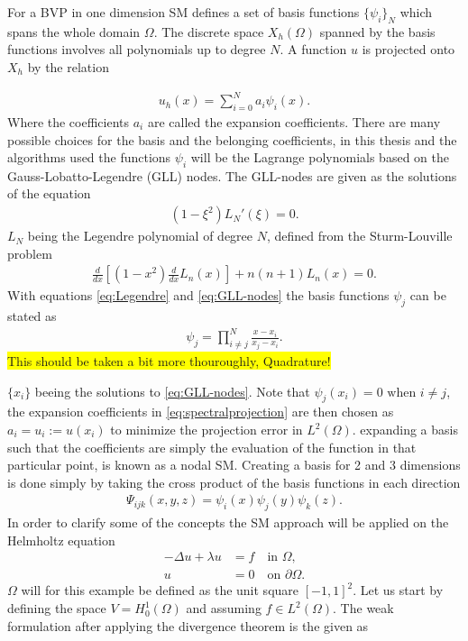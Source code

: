For a BVP in one dimension SM defines a set of basis functions $\{\psi_i\}_N$ which spans the whole domain $\Omega$. 
The discrete space $X_h(\Omega)$ spanned by the basis functions involves all polynomials up to degree $N$.
A function $u$ is projected onto $X_h$ by the relation

\begin{align}
    u_h(x) = \sum_{i=0}^N a_i\psi_i(x).
    \label{eq:spectralprojection}
\end{align}
Where the coefficients $a_i$ are called the expansion coefficients. There are many possible choices for the basis and the belonging coefficients, 
in this thesis and the algorithms used the functions $\psi_i$ will be the Lagrange polynomials based on the Gauss-Lobatto-Legendre (GLL) nodes. 
The GLL-nodes are given as the solutions of the equation 
\begin{align}
    (1-\xi^2)L_N'(\xi) = 0.
    \label{eq:GLL-nodes}
\end{align}
$L_N$ being the Legendre polynomial of degree $N$, defined from the Sturm-Louville problem
\begin{align}
    \frac{d}{dx}\left[  (1-x^2)\frac{d}{dx}L_n(x)\right]+n(n+1)L_n(x) = 0.
    \label{eq:Legendre}
\end{align}
With equations \ref{eq:Legendre} and \ref{eq:GLL-nodes} the basis functions $\psi_j$ can be stated as 
\begin{align}
    \psi_j = \prod_{i\neq j}^{N}\frac{x-x_i}{x_j-x_i}.
    \label{eq:Lagrange}
\end{align}
\colorbox{yellow}{This should be taken a bit more thouroughly, Quadrature! }

$\{x_i\}$ beeing the solutions to \ref{eq:GLL-nodes}. Note that $\psi_j(x_i) = 0 \text{ when } i \neq j$,
the expansion coefficients in \ref{eq:spectralprojection} are then chosen as $a_i = u_i :=u(x_i)$ to minimize the projection error in $L^2(\Omega)$. 
expanding a basis such that the coefficients are simply the evaluation of the function in that particular point, is known as a nodal SM. 
Creating a basis for 2 and 3 dimensions is done simply by taking the cross product of the basis functions in each direction
\begin{align}
    \Psi_{ijk}(x,y,z) = \psi_i(x)\psi_j(y)\psi_k(z).
    \label{eq:3dbasis}
\end{align}
In order to clarify some of the concepts the SM approach will be applied on the Helmholtz equation
%
\begin{align}
    -\Delta u + \lambda u &= f \quad \text{in } \Omega, \\
    u &= 0 \quad \text{on } \partial \Omega.
    \label{eq:Helmholtz}
\end{align}
%
$\Omega$ will for this example be defined as the unit square $[-1,1]^2$. 
Let us start by defining the space $V =H^1_0(\Omega)$ and assuming $f\in L^2(\Omega)$. The weak formulation after applying the divergence theorem is the given as


